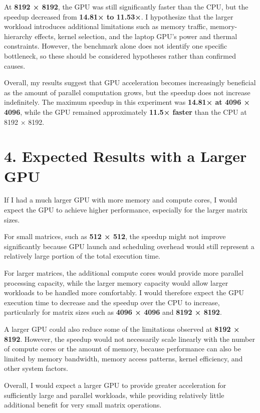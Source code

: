 \documentclass[11pt]{article}
\begin{document}
At \textbf{8192 × 8192}, the GPU was still significantly faster than the
CPU, but the speedup decreased from \textbf{14.81× to 11.53×}. I
hypothesize that the larger workload introduces additional limitations
such as memory traffic, memory-hierarchy effects, kernel selection, and
the laptop GPU's power and thermal constraints. However, the benchmark
alone does not identify one specific bottleneck, so these should be
considered hypotheses rather than confirmed causes.

Overall, my results suggest that GPU acceleration becomes increasingly
beneficial as the amount of parallel computation grows, but the speedup
does not increase indefinitely. The maximum speedup in this experiment
was \textbf{14.81× at 4096 × 4096}, while the GPU remained approximately
\textbf{11.5× faster} than the CPU at 8192 × 8192.

    \section{4. Expected Results with a Larger
GPU}\label{expected-results-with-a-larger-gpu}

If I had a much larger GPU with more memory and compute cores, I would
expect the GPU to achieve higher performance, especially for the larger
matrix sizes.

For small matrices, such as \textbf{512 × 512}, the speedup might not
improve significantly because GPU launch and scheduling overhead would
still represent a relatively large portion of the total execution time.

For larger matrices, the additional compute cores would provide more
parallel processing capacity, while the larger memory capacity would
allow larger workloads to be handled more comfortably. I would therefore
expect the GPU execution time to decrease and the speedup over the CPU
to increase, particularly for matrix sizes such as \textbf{4096 × 4096}
and \textbf{8192 × 8192}.

A larger GPU could also reduce some of the limitations observed at
\textbf{8192 × 8192}. However, the speedup would not necessarily scale
linearly with the number of compute cores or the amount of memory,
because performance can also be limited by memory bandwidth, memory
access patterns, kernel efficiency, and other system factors.

Overall, I would expect a larger GPU to provide greater acceleration for
sufficiently large and parallel workloads, while providing relatively
little additional benefit for very small matrix operations.
\end{document}
